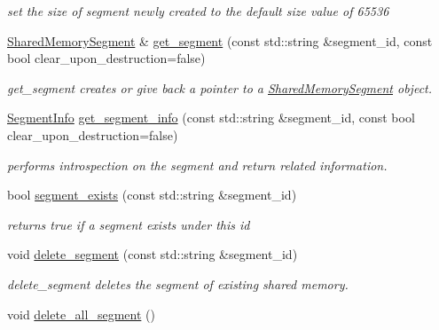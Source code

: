 \begin{DoxyCompactItemize}
\begin{DoxyCompactList}\small\item\em set the size of segment newly created to the default size value of 65536 \end{DoxyCompactList}\item 
\hyperlink{classshared__memory_1_1SharedMemorySegment}{Shared\+Memory\+Segment} \& \hyperlink{namespaceshared__memory_a7c76ec22ab70d3b7487becd3ec9943bc}{get\+\_\+segment} (const std\+::string \&segment\+\_\+id, const bool clear\+\_\+upon\+\_\+destruction=false)
\begin{DoxyCompactList}\small\item\em get\+\_\+segment creates or give back a pointer to a \hyperlink{classshared__memory_1_1SharedMemorySegment}{Shared\+Memory\+Segment} object. \end{DoxyCompactList}\item 
\hyperlink{classshared__memory_1_1SegmentInfo}{Segment\+Info} \hyperlink{namespaceshared__memory_a70f7613a247615e323cab083934c803e}{get\+\_\+segment\+\_\+info} (const std\+::string \&segment\+\_\+id, const bool clear\+\_\+upon\+\_\+destruction=false)
\begin{DoxyCompactList}\small\item\em performs introspection on the segment and return related information. \end{DoxyCompactList}\item 
bool \hyperlink{namespaceshared__memory_a82297c2b7b85c57c53578749c9bd6429}{segment\+\_\+exists} (const std\+::string \&segment\+\_\+id)
\begin{DoxyCompactList}\small\item\em returns true if a segment exists under this id \end{DoxyCompactList}\item 
void \hyperlink{namespaceshared__memory_a60cbce63ae7fb64a2758b773f9006471}{delete\+\_\+segment} (const std\+::string \&segment\+\_\+id)
\begin{DoxyCompactList}\small\item\em delete\+\_\+segment deletes the segment of existing shared memory. \end{DoxyCompactList}\item 
void \hyperlink{namespaceshared__memory_a1f88dd41dca9a23387090866213dbd85}{delete\+\_\+all\+\_\+segment} ()\hypertarget{namespaceshared__memory_a1f88dd41dca9a23387090866213dbd85}{}\label{namespaceshared__memory_a1f88dd41dca9a23387090866213dbd85}


\end{DoxyCompactItemize}
